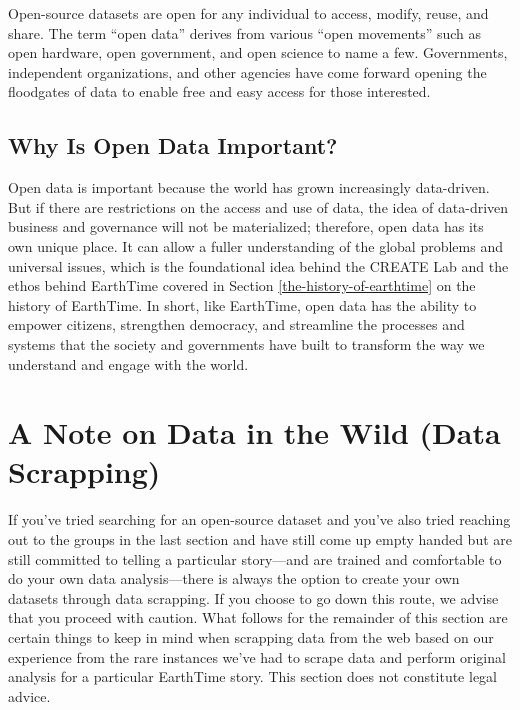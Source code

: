 \documentclass[
]{krantz}
\begin{document}
Open-source datasets are open for any individual to access, modify, reuse, and share. The term ``open data'' derives from various ``open movements'' such as open hardware, open government, and open science to name a few. Governments, independent organizations, and other agencies have come forward opening the floodgates of data to enable free and easy access for those interested.

\hypertarget{why-is-open-data-important}{%
\subsection*{Why Is Open Data Important?}\label{why-is-open-data-important}}


Open data is important because the world has grown increasingly data-driven. But if there are restrictions on the access and use of data, the idea of data-driven business and governance will not be materialized; therefore, open data has its own unique place. It can allow a fuller understanding of the global problems and universal issues, which is the foundational idea behind the CREATE Lab and the ethos behind EarthTime covered in Section \ref{the-history-of-earthtime} on the history of EarthTime. In short, like EarthTime, open data has the ability to empower citizens, strengthen democracy, and streamline the processes and systems that the society and governments have built to transform the way we understand and engage with the world.

\hypertarget{a-note-on-data-in-the-wild-data-scrapping}{%
\section{A Note on Data in the Wild (Data Scrapping)}\label{a-note-on-data-in-the-wild-data-scrapping}}

If you've tried searching for an open-source dataset and you've also tried reaching out to the groups in the last section and have still come up empty handed but are still committed to telling a particular story---and are trained and comfortable to do your own data analysis---there is always the option to create your own datasets through data scrapping. If you choose to go down this route, we advise that you proceed with caution. What follows for the remainder of this section are certain things to keep in mind when scrapping data from the web based on our experience from the rare instances we've had to scrape data and perform original analysis for a particular EarthTime story. This section does not constitute legal advice.
\end{document}
